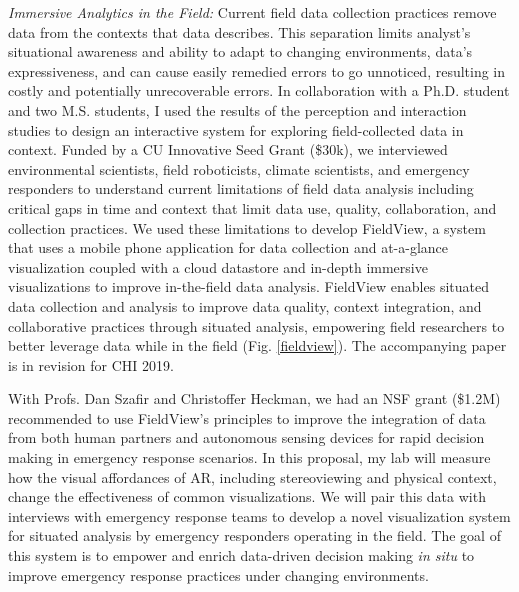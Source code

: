 \documentclass[11pt]{article}
\begin{document}
\emph{Immersive Analytics in the Field:} Current field data collection practices remove data from the contexts that data describes. This separation limits analyst's situational awareness and ability to adapt to changing environments, data's expressiveness, and can cause easily remedied errors to go unnoticed, resulting in costly and potentially unrecoverable errors. In collaboration with a Ph.D. student and two M.S. students, I used the results of the perception and interaction studies to design an interactive system for exploring field-collected data in context. Funded by a CU Innovative Seed Grant (\$30k), we interviewed environmental scientists, field roboticists, climate scientists, and emergency responders to understand current limitations of field data analysis including critical gaps in time and context that limit data use, quality, collaboration, and collection practices. We used these limitations to develop FieldView, a system that uses a mobile phone application for data collection and at-a-glance visualization coupled with a cloud datastore and in-depth immersive visualizations to improve in-the-field data analysis. 
FieldView enables situated data collection and analysis to improve data quality, context integration, and collaborative practices through situated analysis, empowering field researchers to better leverage data while in the field (Fig. \ref{fieldview}). The accompanying paper is in revision for CHI 2019. 

With Profs. Dan Szafir and Christoffer Heckman, we had an NSF grant (\$1.2M) recommended to use FieldView's principles to improve the integration of data from both human partners and autonomous sensing devices for rapid decision making in emergency response scenarios. In this proposal, my lab will measure how the visual affordances of AR, including stereoviewing and physical context, change the effectiveness of common visualizations. We will pair this data with interviews with emergency response teams to develop a novel visualization system for situated analysis by emergency responders operating in the field. The goal of this system is to empower and enrich data-driven decision making \emph{in situ} to improve emergency response practices under changing environments. 
\end{document}
